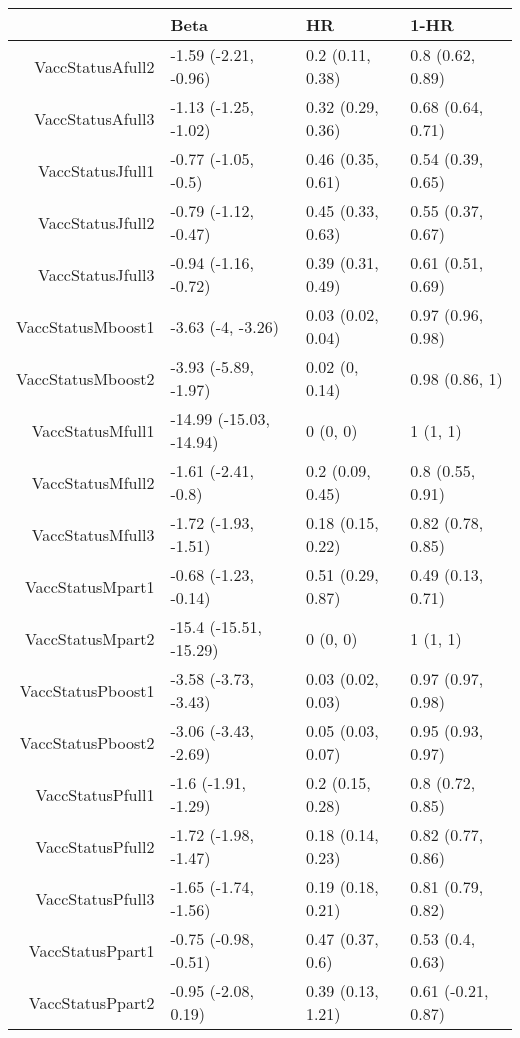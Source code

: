 \begin{table}[ht]
\centering
\begin{tabular}{rlll}
  \hline
 & Beta & HR & 1-HR \\ 
  \hline
VaccStatusAfull2 & -1.59 (-2.21, -0.96) & 0.2 (0.11, 0.38) & 0.8 (0.62, 0.89) \\ 
  VaccStatusAfull3 & -1.13 (-1.25, -1.02) & 0.32 (0.29, 0.36) & 0.68 (0.64, 0.71) \\ 
  VaccStatusJfull1 & -0.77 (-1.05, -0.5) & 0.46 (0.35, 0.61) & 0.54 (0.39, 0.65) \\ 
  VaccStatusJfull2 & -0.79 (-1.12, -0.47) & 0.45 (0.33, 0.63) & 0.55 (0.37, 0.67) \\ 
  VaccStatusJfull3 & -0.94 (-1.16, -0.72) & 0.39 (0.31, 0.49) & 0.61 (0.51, 0.69) \\ 
  VaccStatusMboost1 & -3.63 (-4, -3.26) & 0.03 (0.02, 0.04) & 0.97 (0.96, 0.98) \\ 
  VaccStatusMboost2 & -3.93 (-5.89, -1.97) & 0.02 (0, 0.14) & 0.98 (0.86, 1) \\ 
  VaccStatusMfull1 & -14.99 (-15.03, -14.94) & 0 (0, 0) & 1 (1, 1) \\ 
  VaccStatusMfull2 & -1.61 (-2.41, -0.8) & 0.2 (0.09, 0.45) & 0.8 (0.55, 0.91) \\ 
  VaccStatusMfull3 & -1.72 (-1.93, -1.51) & 0.18 (0.15, 0.22) & 0.82 (0.78, 0.85) \\ 
  VaccStatusMpart1 & -0.68 (-1.23, -0.14) & 0.51 (0.29, 0.87) & 0.49 (0.13, 0.71) \\ 
  VaccStatusMpart2 & -15.4 (-15.51, -15.29) & 0 (0, 0) & 1 (1, 1) \\ 
  VaccStatusPboost1 & -3.58 (-3.73, -3.43) & 0.03 (0.02, 0.03) & 0.97 (0.97, 0.98) \\ 
  VaccStatusPboost2 & -3.06 (-3.43, -2.69) & 0.05 (0.03, 0.07) & 0.95 (0.93, 0.97) \\ 
  VaccStatusPfull1 & -1.6 (-1.91, -1.29) & 0.2 (0.15, 0.28) & 0.8 (0.72, 0.85) \\ 
  VaccStatusPfull2 & -1.72 (-1.98, -1.47) & 0.18 (0.14, 0.23) & 0.82 (0.77, 0.86) \\ 
  VaccStatusPfull3 & -1.65 (-1.74, -1.56) & 0.19 (0.18, 0.21) & 0.81 (0.79, 0.82) \\ 
  VaccStatusPpart1 & -0.75 (-0.98, -0.51) & 0.47 (0.37, 0.6) & 0.53 (0.4, 0.63) \\ 
  VaccStatusPpart2 & -0.95 (-2.08, 0.19) & 0.39 (0.13, 1.21) & 0.61 (-0.21, 0.87) \\ 

\end{tabular}
\end{table}
